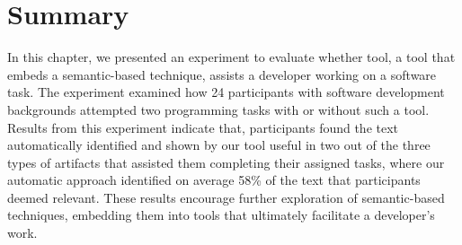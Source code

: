 \section{Summary}
\label{cp6:summary}



In this chapter, we presented an experiment to evaluate whether \acs{tool},
 a tool that embeds a semantic-based technique, assists a developer working on a software task. 
The experiment examined how 24 participants with software development backgrounds attempted 
two programming tasks with or without such a tool. 
Results from this experiment indicate that, 
participants found the text automatically identified and shown by our tool useful in two 
out of the three types of artifacts that assisted them completing their assigned tasks,
where our automatic approach identified on average 58\% of the text that participants deemed relevant. 
These results encourage further exploration of semantic-based techniques, 
embedding them into tools that ultimately facilitate a developer's work.